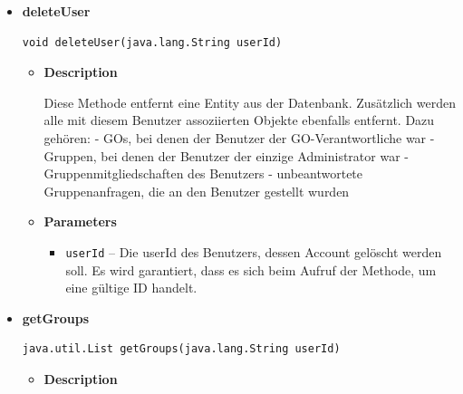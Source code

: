 \documentclass[11pt,a4paper]{article}
\begin{document}
{{{{{{{{{{{\begin{itemize}
{\begin{itemize}
{Die Methode fügt eine neue UserEntity in die Datenbank ein.
}
\item{
{\bf  Parameters}
  \begin{itemize}
   \item{
\texttt{user} -- Die Entity, die in die Datenbank eingefügt werden soll. Dieses Objekt muss eine in der Datenbank noch nicht vorhandene ID enthalten, sonst schlägt die Ausführung fehl.}
  \end{itemize}
}%
\end{itemize}
}%
\item{ 
\hypertarget{edu.kit.pse17.go_app.PersistenceLayer.daos.UserDao.deleteUser(java.lang.String)}{{\bf  deleteUser}\\}
\begin{lstlisting}[frame=none]
void deleteUser(java.lang.String userId)\end{lstlisting} %
\begin{itemize}
\item{
{\bf  Description}

Diese Methode entfernt eine Entity aus der Datenbank. Zusätzlich werden alle mit diesem Benutzer assoziierten Objekte ebenfalls entfernt. Dazu gehören: - GOs, bei denen der Benutzer der GO-Verantwortliche war - Gruppen, bei denen der Benutzer der einzige Administrator war - Gruppenmitgliedschaften des Benutzers - unbeantwortete Gruppenanfragen, die an den Benutzer gestellt wurden
}
\item{
{\bf  Parameters}
  \begin{itemize}
   \item{
\texttt{userId} -- Die userId des Benutzers, dessen Account gelöscht werden soll. Es wird garantiert, dass es sich beim Aufruf der Methode, um eine gültige ID handelt.}
  \end{itemize}
}%
\end{itemize}
}%
\item{ 
\hypertarget{edu.kit.pse17.go_app.PersistenceLayer.daos.UserDao.getGroups(java.lang.String)}{{\bf  getGroups}\\}
\begin{lstlisting}[frame=none]
java.util.List getGroups(java.lang.String userId)\end{lstlisting} %
\begin{itemize}
\item{
{\bf  Description}

}
\end{itemize}}
\end{itemize}}}}}}}}}}}}
\end{document}
